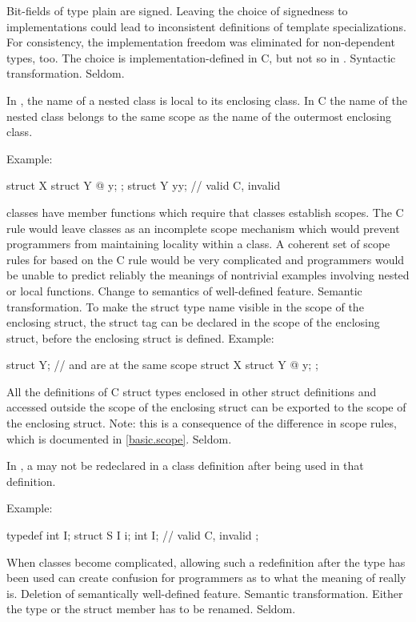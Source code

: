 \change
{}%
Bit-fields of type plain  are signed.
\rationale
Leaving the choice of signedness to implementations could lead to
inconsistent definitions of template specializations. For consistency,
the implementation freedom was eliminated for non-dependent types,
too.
\effect
The choice is implementation-defined in C, but not so in \Cpp{}.
\difficulty
Syntactic transformation.
\howwide
Seldom.

\change
In \Cpp{}, the name of a nested class is local to its enclosing class. In C
the name of the nested class belongs to the same scope as the name of the outermost enclosing class.

Example:
\begin{codeblock}
struct X {
  struct Y { @\commentellip@ } y;
};
struct Y yy;                    // valid C, invalid \Cpp{}
\end{codeblock}
\rationale
\Cpp{} classes have member functions which require that classes
establish scopes.
The C rule would leave classes as an incomplete scope mechanism
which would prevent \Cpp{} programmers from maintaining locality
within a class.
A coherent set of scope rules for \Cpp{} based on the C rule would
be very complicated and \Cpp{} programmers would be unable to predict
reliably the meanings of nontrivial examples involving nested or
local functions.
\effect
Change to semantics of well-defined feature.
\difficulty
Semantic transformation.
To make the struct type name visible in the scope of the enclosing
struct, the struct tag can be declared in the scope of the
enclosing struct, before the enclosing struct is defined.
Example:
\begin{codeblock}
struct Y;                       //  and  are at the same scope
struct X {
  struct Y { @\commentellip@ } y;
};
\end{codeblock}

All the definitions of C struct types enclosed in other struct
definitions and accessed outside the scope of the enclosing
struct can be exported to the scope of the enclosing struct.
Note: this is a consequence of the difference in scope rules,
which is documented in \ref{basic.scope}.
\howwide
Seldom.

\change
In \Cpp{}, a  may not be redeclared in a class definition after being used in that definition.

Example:
\begin{codeblock}
typedef int I;
struct S {
  I i;
  int I;            // valid C, invalid \Cpp{}
};
\end{codeblock}
\rationale
When classes become complicated, allowing such a redefinition
after the type has been used can create confusion for \Cpp{}
programmers as to what the meaning of  really is.
\effect
Deletion of semantically well-defined feature.
\difficulty
Semantic transformation.
Either the type or the struct member has to be renamed.
\howwide
Seldom.

